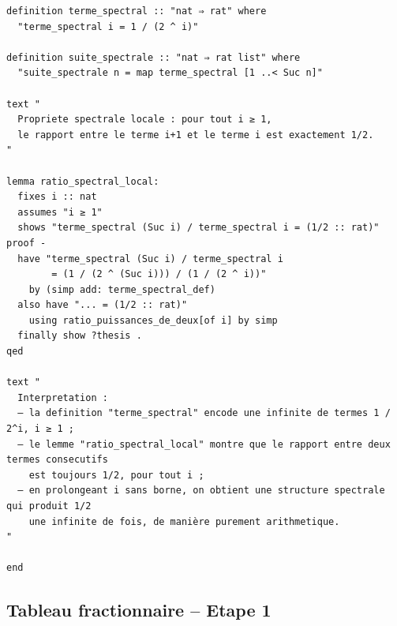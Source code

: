 \documentclass[a4paper,11pt]{article}
\begin{document}
\begin{holcode}[title={\textcolor{white}{Fichier : methode\_de\_philippot.thy -- COMPLET}}]
\begin{lstlisting}
definition terme_spectral :: "nat ⇒ rat" where
  "terme_spectral i = 1 / (2 ^ i)"

definition suite_spectrale :: "nat ⇒ rat list" where
  "suite_spectrale n = map terme_spectral [1 ..< Suc n]"

text "
  Propriete spectrale locale : pour tout i ≥ 1,
  le rapport entre le terme i+1 et le terme i est exactement 1/2.
"

lemma ratio_spectral_local:
  fixes i :: nat
  assumes "i ≥ 1"
  shows "terme_spectral (Suc i) / terme_spectral i = (1/2 :: rat)"
proof -
  have "terme_spectral (Suc i) / terme_spectral i
        = (1 / (2 ^ (Suc i))) / (1 / (2 ^ i))"
    by (simp add: terme_spectral_def)
  also have "... = (1/2 :: rat)"
    using ratio_puissances_de_deux[of i] by simp
  finally show ?thesis .
qed

text "
  Interpretation :
  – la definition "terme_spectral" encode une infinite de termes 1 / 2^i, i ≥ 1 ;
  – le lemme "ratio_spectral_local" montre que le rapport entre deux termes consecutifs
    est toujours 1/2, pour tout i ;
  – en prolongeant i sans borne, on obtient une structure spectrale qui produit 1/2
    une infinite de fois, de manière purement arithmetique.
"

end

\end{lstlisting}
\end{holcode}

\subsection{Tableau fractionnaire -- Etape 1}
\end{document}
